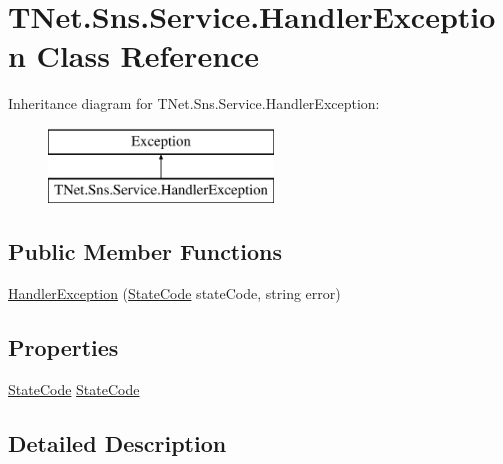 \hypertarget{class_t_net_1_1_sns_1_1_service_1_1_handler_exception}{}\section{T\+Net.\+Sns.\+Service.\+Handler\+Exception Class Reference}
\label{class_t_net_1_1_sns_1_1_service_1_1_handler_exception}


 


Inheritance diagram for T\+Net.\+Sns.\+Service.\+Handler\+Exception\+:\begin{figure}[H]
\begin{center}
\leavevmode
\includegraphics[height=2.000000cm]{class_t_net_1_1_sns_1_1_service_1_1_handler_exception}
\end{center}
\end{figure}
\subsection*{Public Member Functions}
\begin{DoxyCompactItemize}
\item 
\mbox{\hyperlink{class_t_net_1_1_sns_1_1_service_1_1_handler_exception_a19cbc89615fbfd2bef6b448a8b8da05a}{Handler\+Exception}} (\mbox{\hyperlink{namespace_t_net_1_1_sns_1_1_service_ab93c34900ebc0ee83129c9ccab1e4bd8}{State\+Code}} state\+Code, string error)
\end{DoxyCompactItemize}
\subsection*{Properties}
\begin{DoxyCompactItemize}
\item 
\mbox{\hyperlink{namespace_t_net_1_1_sns_1_1_service_ab93c34900ebc0ee83129c9ccab1e4bd8}{State\+Code}} \mbox{\hyperlink{class_t_net_1_1_sns_1_1_service_1_1_handler_exception_ae41ef5790dcb8c2684c25f44795e2c1d}{State\+Code}}
\end{DoxyCompactItemize}


\subsection{Detailed Description}




